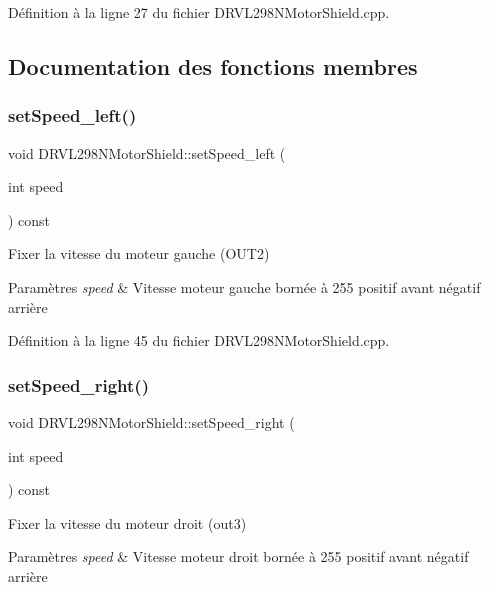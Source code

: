 Définition à la ligne 27 du fichier D\+R\+V\+L298\+N\+Motor\+Shield.\+cpp.



\subsection{Documentation des fonctions membres}
\mbox{\label{class_d_r_v_l298_n_motor_shield_ac80684b28448c2a9587364e9d794df4b}} 
\subsubsection{set\+Speed\+\_\+left()}
{\footnotesize\ttfamily void D\+R\+V\+L298\+N\+Motor\+Shield\+::set\+Speed\+\_\+left (\begin{DoxyParamCaption}\item[{int}]{speed }\end{DoxyParamCaption}) const}

Fixer la vitesse du moteur gauche (O\+U\+T2) 
\begin{DoxyParams}{Paramètres}
{\em speed} & Vitesse moteur gauche bornée à 255 positif avant négatif arrière\\
\hline
\end{DoxyParams}


Définition à la ligne 45 du fichier D\+R\+V\+L298\+N\+Motor\+Shield.\+cpp.

\mbox{\label{class_d_r_v_l298_n_motor_shield_af0983647b57a4bcbb13910830a3ecce9}} 
\subsubsection{set\+Speed\+\_\+right()}
{\footnotesize\ttfamily void D\+R\+V\+L298\+N\+Motor\+Shield\+::set\+Speed\+\_\+right (\begin{DoxyParamCaption}\item[{int}]{speed }\end{DoxyParamCaption}) const}

Fixer la vitesse du moteur droit (out3) 
\begin{DoxyParams}{Paramètres}
{\em speed} & Vitesse moteur droit bornée à 255 positif avant négatif arrière\\
\hline
\end{DoxyParams}


